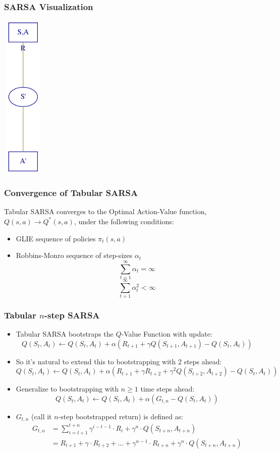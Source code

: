 \documentclass[handout]{beamer}
\begin{document}
\begin{frame}
\frametitle{SARSA Visualization}
\centerline{\includegraphics[width=2cm, height=8cm]{sarsa.png}}
\end{frame}


\begin{frame}
\frametitle{Convergence of Tabular SARSA}
\pause
\begin{theorem}
Tabular SARSA converges to the Optimal Action-Value function, $Q(s,a) \rightarrow Q^*(s,a)$, under the following conditions:
\pause
\begin{itemize}[<+->]
\item GLIE sequence of policies $\pi_t(s,a)$
\item Robbins-Monro sequence of step-sizes $\alpha_t$
$$\sum_{t=1}^{\infty} \alpha_t = \infty$$
$$\sum_{t=1}^{\infty} \alpha_t^2 < \infty$$
\end{itemize}
\end{theorem}
\end{frame}


\begin{frame}
\frametitle{Tabular $n$-step SARSA}
\pause
\begin{itemize}[<+->]
\item Tabular SARSA bootstraps the $Q$-Value Function with update:
$$Q(S_t, A_t) \leftarrow Q(S_t, A_t) + \alpha (R_{t+1} + \gamma Q(S_{t+1}, A_{t+1}) - Q(S_t, A_t))$$
\item So it's natural to extend this to bootstrapping with 2 steps ahead:
$$Q(S_t, A_t) \leftarrow Q(S_t, A_t) + \alpha (R_{t+1} + \gamma R_{t+2} + \gamma^2 Q(S_{t+2}, A_{t+2})- Q(S_t, A_t))$$
\item Generalize to bootstrapping with $n \geq 1$ time steps ahead:
$$Q(S_t, A_t) \leftarrow Q(S_t, A_t) + \alpha (G_{t,n} - Q(S_t, A_t))$$
\item $G_{t,n}$ (call it $n$-step bootstrapped return) is defined as:
\begin{align*}
G_{t,n} & = \sum_{i=t+1}^{t+n} \gamma^{i-t-1} \cdot R_i  + \gamma^n \cdot Q(S_{t+n}, A_{t+n}) \\
& = R_{t+1} + \gamma \cdot R_{t+2} + \ldots + \gamma^{n-1} \cdot R_{t+n} + \gamma^n \cdot Q(S_{t+n}, A_{t+n})
\end{align*}
\end{itemize}
\end{frame}
\end{document}

